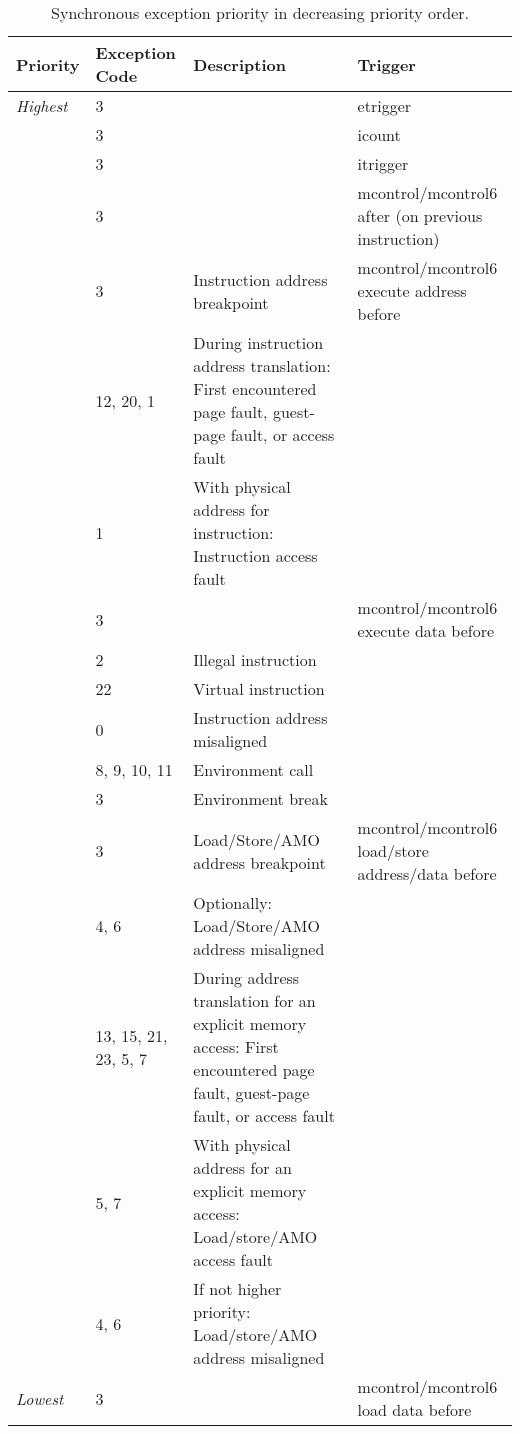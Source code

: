 \begin{table}[H]
\centering
\begin{tabulary}{\textwidth}{|l|p{.7in}|p{2.3in}|p{2.5in}|}
  \hline
  Priority      & Exception Code & Description & Trigger \\
  \hline
  {\em Highest} &          3 & & etrigger \\
                &          3 & & icount \\
                &          3 & & itrigger \\
                &          3 & & mcontrol/mcontrol6 after (on previous instruction) \\
                \hline
                &          3 & Instruction address breakpoint & mcontrol/mcontrol6 execute address before \\ \hline
                &  12, 20, 1 & During instruction address translation:
                                First encountered page fault, guest-page fault, or access fault & \\ \hline
                &          1 & With physical address for instruction:
                                Instruction access fault & \\ \hline
                &          3 & & mcontrol/mcontrol6 execute data before \\ \hline
                &          2 & Illegal instruction & \\
                &         22 & Virtual instruction & \\
                &          0 & Instruction address misaligned & \\
                & 8, 9, 10, 11 & Environment call & \\
                &          3 & Environment break & \\
                &          3 & Load/Store/AMO address breakpoint & mcontrol/mcontrol6 load/store address/data before \\ \hline
                &       4, 6 & Optionally: Load/Store/AMO address misaligned & \\ \hline
                & 13, 15, 21, 23, 5, 7 & During address translation for an explicit memory access:
                                    First encountered page fault, guest-page fault, or access fault & \\ \hline
                & 5, 7       & With physical address for an explicit memory access:
                                Load/store/AMO access fault & \\ \hline
                & 4, 6       & If not higher priority:
                                Load/store/AMO address misaligned & \\ \hline
  {\em Lowest}  &          3 & & mcontrol/mcontrol6 load data before \\ \hline
\end{tabulary}
\caption{Synchronous exception priority in decreasing priority order.}
\label{tab:priority}
\end{table}

